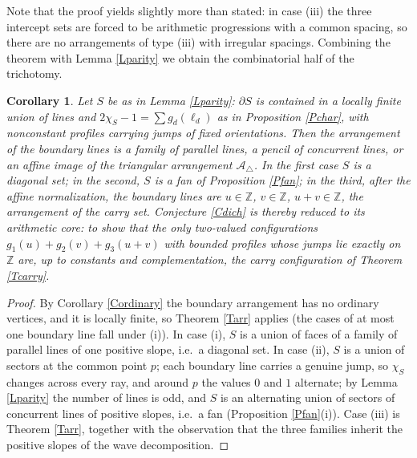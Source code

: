 \documentclass{article}
\newtheorem{corollary}{Corollary}[theorem]
\def\Z{{\mathbb Z}}
\begin{document}
	Note that the proof yields slightly more than stated: in case (iii) the three intercept sets are forced to be arithmetic progressions with a common spacing, so there are no arrangements of type (iii) with irregular spacings. Combining the theorem with Lemma \ref{Lparity} we obtain the combinatorial half of the trichotomy.

	\begin{corollary}\label{Carr}
		Let $S$ be as in Lemma \ref{Lparity}: $\partial S$ is contained in a locally finite union of lines and $2\chi_S-1=\sum g_d(\ell_d)$ as in Proposition \ref{Pchar}, with nonconstant profiles carrying jumps of fixed orientations. Then the arrangement of the boundary lines is a family of parallel lines, a pencil of concurrent lines, or an affine image of the triangular arrangement $\mathcal A_\triangle$. In the first case $S$ is a diagonal set; in the second, $S$ is a fan of Proposition \ref{Pfan}; in the third, after the affine normalization, the boundary lines are $u\in\Z$, $v\in\Z$, $u+v\in\Z$, the arrangement of the carry set. Conjecture \ref{Cdich} is thereby reduced to its arithmetic core: to show that the only two-valued configurations $g_1(u)+g_2(v)+g_3(u+v)$ with bounded profiles whose jumps lie exactly on $\Z$ are, up to constants and complementation, the carry configuration of Theorem \ref{Tcarry}.
	\end{corollary}

	\begin{proof}
		By Corollary \ref{Cordinary} the boundary arrangement has no ordinary vertices, and it is locally finite, so Theorem \ref{Tarr} applies (the cases of at most one boundary line fall under (i)). In case (i), $S$ is a union of faces of a family of parallel lines of one positive slope, i.e.\ a diagonal set. In case (ii), $S$ is a union of sectors at the common point $p$; each boundary line carries a genuine jump, so $\chi_S$ changes across every ray, and around $p$ the values $0$ and $1$ alternate; by Lemma \ref{Lparity} the number of lines is odd, and $S$ is an alternating union of sectors of concurrent lines of positive slopes, i.e.\ a fan (Proposition \ref{Pfan}(i)). Case (iii) is Theorem \ref{Tarr}, together with the observation that the three families inherit the positive slopes of the wave decomposition.
	\end{proof}
\end{document}
